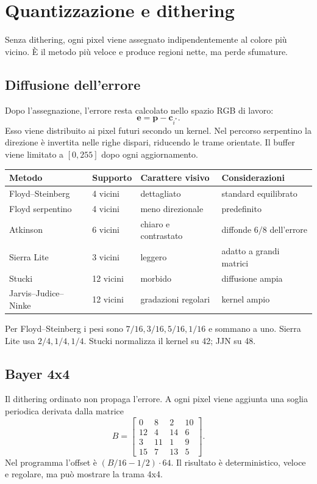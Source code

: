 \documentclass[11pt,a4paper]{article}
\begin{document}
\section{Quantizzazione e dithering}
Senza dithering, ogni pixel viene assegnato indipendentemente al colore più vicino. È il metodo più veloce e produce regioni nette, ma perde sfumature.

\subsection{Diffusione dell'errore}
Dopo l'assegnazione, l'errore resta calcolato nello spazio RGB di lavoro:
\[\mathbf e=\mathbf p-\mathbf c_{i^*}.\]
Esso viene distribuito ai pixel futuri secondo un kernel. Nel percorso serpentino la direzione è invertita nelle righe dispari, riducendo le trame orientate. Il buffer viene limitato a $[0,255]$ dopo ogni aggiornamento.

\begin{center}\small
\begin{tabularx}{\textwidth}{@{}P{32mm}P{27mm}LL@{}}\toprule
Metodo & Supporto & Carattere visivo & Considerazioni \\\midrule
Floyd--Steinberg & 4 vicini & dettagliato & standard equilibrato \\
Floyd serpentino & 4 vicini & meno direzionale & predefinito \\
Atkinson & 6 vicini & chiaro e contrastato & diffonde $6/8$ dell'errore \\
Sierra Lite & 3 vicini & leggero & adatto a grandi matrici \\
Stucki & 12 vicini & morbido & diffusione ampia \\
Jarvis--Judice--Ninke & 12 vicini & gradazioni regolari & kernel ampio \\\bottomrule
\end{tabularx}
\end{center}
Per Floyd--Steinberg i pesi sono $7/16,3/16,5/16,1/16$ e sommano a uno. Sierra Lite usa $2/4,1/4,1/4$. Stucki normalizza il kernel su 42; JJN su 48.

\subsection{Bayer 4x4}
Il dithering ordinato non propaga l'errore. A ogni pixel viene aggiunta una soglia periodica derivata dalla matrice
\[B=\begin{bmatrix}0&8&2&10\\12&4&14&6\\3&11&1&9\\15&7&13&5\end{bmatrix}.\]
Nel programma l'offset è $(B/16-1/2)\cdot64$. Il risultato è deterministico, veloce e regolare, ma può mostrare la trama 4x4.
\end{document}
